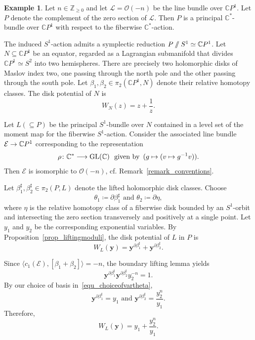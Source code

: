 \documentclass[11pt]{amsart}
\theoremstyle{plain}
\theoremstyle{definition}
\newtheorem{example}[theorem]{Example}
\theoremstyle{remark}
\newcommand{\C}{\mathbb{C}}
\newcommand{\CP}{\mathbb{C}P}
\newcommand{\git}{\mathbin{/\mkern-6mu/}}
\numberwithin{equation}{section} \numberwithin{table}{section}
\def\to{\mathchoice{\longrightarrow}{\rightarrow}{\rightarrow}{\rightarrow}}
\numberwithin{equation}{section}
\begin{document}
\begin{example}
Let $n \in \mathbb{Z}_{\geq 0}$ and let $\mathcal{L} = \mathcal{O}(-n)$ be the line bundle over $\CP^1$. Let $P$ denote the complement of the zero section of $\mathcal{L}$. Then $P$ is a principal $\C^*$-bundle over $\CP^1$ with respect to the fiberwise $\C^*$-action. 

The induced $S^1$-action admits a symplectic reduction $P \git S^1 \simeq \CP^1$. Let $N \subseteq \CP^1$ be an equator, regarded as a Lagrangian submanifold that divides $\CP^1 \simeq S^2$ into two hemispheres. There are precisely two holomorphic disks of Maslov index two, one passing through the north pole and the other passing through the south pole. Let $\beta_1, \beta_2 \in\pi_2(\CP^1,N)$ denote their relative homotopy classes. The disk potential of $N$ is 
$$
W_{N}(z) = z + \frac{1}{z}.
$$

Let $L (\subseteq P)$ be the principal $S^1$-bundle over $N$ contained in a level set of the moment map for the fiberwise $S^1$-action. Consider the associated line bundle $\mathcal{E} \to \CP^1$ corresponding to the representation 
$$
\rho \colon \C^* \to \mathrm{GL}(\C)\,\, \mbox{ given by } \, (g \mapsto (v \mapsto g^{-1}v)).
$$ 
Then $\mathcal{E}$ is isomorphic to $\mathcal{O}(-n)$, cf. Remark~\ref{remark_conventions}. 

Let $\beta_1^\sharp, \beta_2^\sharp \in \pi_2(P,L)$ denote the lifted holomorphic disk classes. Choose 
\begin{equation}\label{equ_choiceofvartheta}
\theta_1 \coloneqq \partial \beta_1^\sharp \mbox{ and } \theta_2 \coloneqq \partial \eta,
\end{equation}
where $\eta$ is the relative homotopy class of a fiberwise disk bounded by an $S^1$-orbit and intersecting the zero section transversely and positively at a single point. Let $y_1$ and $y_2$ be the corresponding exponential variables. By Proposition~\ref{prop_liftingmoduli}, the disk potential of $L$ in $P$ is 
$$
W_{L}(\mathbf{y}) = \mathbf{y}^{\partial \beta_1^\sharp} + \mathbf{y}^{\partial \beta_2^\sharp}.
$$

Since $\langle c_1(\mathcal{E}), [\beta_1 + \beta_2] \rangle = - n$,
the boundary lifting lemma yields
$$
\mathbf{y}^{\partial \beta_1^\sharp} \mathbf{y}^{\partial \beta_2^\sharp} y_2^{-n} = 1.
$$
By our choice of basis in~\eqref{equ_choiceofvartheta},
$$
\mathbf{y}^{\partial \beta_1^\sharp} = y_1 \mbox{ and } \mathbf{y}^{\partial \beta_2^\sharp} = \frac{y_2^n}{y_1}.
$$
Therefore,
\begin{equation}\label{equ_diskpotentialLO(-n)}
W_{L}(\mathbf{y}) = y_1 + \frac{y_2^n}{y_1}.
\end{equation}
\end{example}
\end{document}
